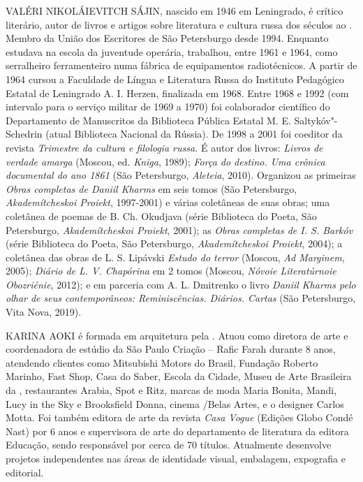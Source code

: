 \noindent{}VALÉRI NIKOLÁIEVITCH SÁJIN, nascido em 1946 em Leningrado, é crítico
literário, autor de livros e artigos sobre literatura e cultura russa
dos séculos \scalebox{.8}{XVIII} ao \scalebox{.8}{XX}.
Membro da União dos Escritores de São
Petersburgo desde 1994. Enquanto estudava na escola da juventude
operária, trabalhou, entre 1961 e 1964, como serralheiro ferramenteiro
numa fábrica de equipamentos radiotécnicos. A partir de 1964 cursou a
Faculdade de Língua e Literatura Russa do Instituto Pedagógico Estatal
de Leningrado A. I. Herzen, finalizada em 1968. Entre 1968 e 1992 (com
intervalo para o serviço militar de 1969 a 1970) foi colaborador
científico do Departamento de Manuscritos da Biblioteca Pública Estatal
M. E. Saltykóv"-Schedrin (atual Biblioteca Nacional da Rússia). De 1998 a
2001 foi coeditor da revista \emph{Trimestre da cultura e filologia
russa.} É autor dos livros: \emph{Livros de verdade amarga} (Moscou, ed.
\emph{Kniga}, 1989); \emph{Força do destino. Uma crônica documental do
ano 1861} (São Petersburgo, \emph{Aleteia}, 2010). Organizou as
primeiras \emph{Obras completas de Daniil Kharms} em seis tomos (São
Petersburgo, \emph{Akademítcheskoi Proiekt}, 1997-2001) e várias
coletâneas de suas obras; uma coletânea de poemas de B. Ch. Okudjava
(série Biblioteca do Poeta, São Petersburgo, \emph{Akademítcheskoi
Proiekt}, 2001); as \emph{Obras completas de I. S. Barkóv} (série
Biblioteca do Poeta, São Petersburgo, \emph{Akademítcheskoi Proiekt},
2004); a coletânea das obras de L. S. Lipávski \emph{Estudo do terror}
(Moscou, \emph{Ad Marginem}, 2005); \emph{Diário de L. V. Chapórina} em
2 tomos (Moscou, \emph{Nóvoie Literatúrnoie Obozriénie}, 2012); e em
parceria com A. L. Dmitrenko o livro \emph{Daniil Kharms pelo olhar de
seus contemporâneos: Reminiscências. Diários. Cartas} (São Petersburgo,
Vita Nova, 2019).

\medskip

\noindent{}KARINA AOKI é formada em arquitetura pela \scalebox{.8}{FAU-USP}. Atuou como diretora de arte e coordenadora de estúdio da São Paulo Criação -- Rafic Farah
durante 8 anos, atendendo clientes como Mitsubishi Motors do Brasil,
Fundação Roberto Marinho, Fast Shop, Casa do Saber, Escola da Cidade,
Museu de Arte Brasileira da \scalebox{.8}{FAAP}, restaurantes Arabia, Spot e Ritz,
marcas de moda Maria Bonita, Mandi, Lucy in the Sky e Brooksfield Donna,
cinema \scalebox{.8}{HSBC}/Belas Artes, e o designer Carlos Motta. Foi também editora
de arte da revista \emph{Casa Vogue} (Edições Globo Condé Nast) por 6 anos e
supervisora de arte do departamento de literatura da editora \scalebox{.8}{FTD}
Educação, sendo responsável por cerca de 70 títulos. Atualmente
desenvolve projetos independentes nas áreas de identidade visual,
embalagem, expografia e editorial.

